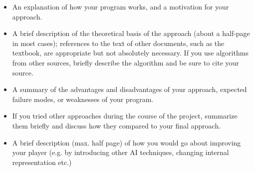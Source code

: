 \documentclass[twoside,11pt]{article}
\begin{document}
\begin{itemize}
    \item An explanation of how your program works, and a motivation for your approach.
    \item A brief description of the theoretical basis of the approach (about a half-page in most cases); references to the text of other documents, such as the textbook, are appropriate but not absolutely necessary. If you use algorithms from other sources, briefly describe the algorithm and be sure to cite your source.
    \item A summary of the advantages and disadvantages of your approach, expected failure modes, or weaknesses of your program.
    \item If you tried other approaches during the course of the project, summarize them briefly and discuss how they compared to your final approach.
    \item A brief description (max. half page) of how you would go about improving your player (e.g. by introducing other AI techniques, changing internal representation etc.)
    
\end{itemize}

% 
\end{document}
